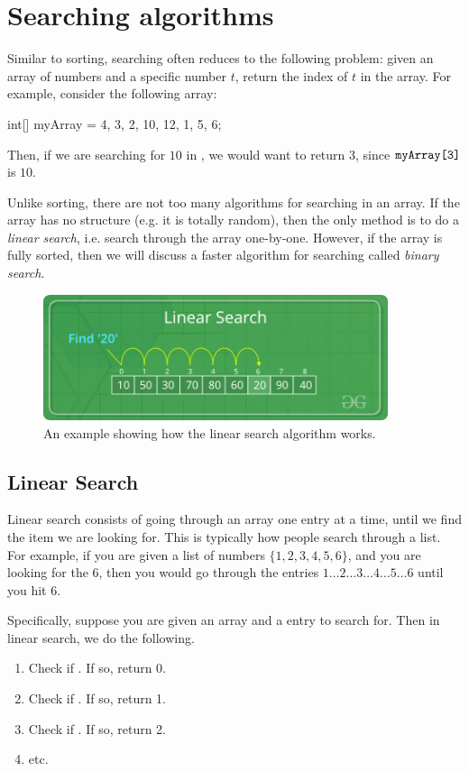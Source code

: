  
\section{Searching algorithms}

Similar to sorting, searching often reduces to the following problem: given an array  of numbers and a specific number $t$, return the index of $t$ in the array. For example, consider the following  array:
\begin{code}
int[] myArray = {4, 3, 2, 10, 12, 1, 5, 6};
\end{code}
Then, if we are searching for $10$ in , we would want to return $3$, since $\texttt{myArray[3]}$ is $10$.

Unlike sorting, there are not too many algorithms for searching in an array. If the array has no structure (e.g. it is totally random), then the only method is to do a \emph{linear search}, i.e. search through the array one-by-one. However, if the array is fully sorted, then we will discuss a faster algorithm for searching called \emph{binary search}.

  \begin{figure}
    \centering
    \includegraphics[width=0.9\textwidth]{lectures/images/Linear-Search.png}
    \caption{An example showing how the linear search algorithm works.}
    \label{fig:linear_search}
\end{figure}

\subsection{Linear Search}

Linear search consists of going through an array one entry at a time, until we find the item we are looking for. This is typically how people search through a list. For example, if you are given a list of numbers $\{1, 2, 3, 4, 5, 6\}$, and you are looking for the $6$, then you would go through the entries $1\dots 2\dots 3 \dots 4 \dots 5 \dots 6$ until you hit $6$.

Specifically, suppose you are given an array  and a entry  to search for. Then in linear search, we do the following.
\begin{enumerate}
    \item Check if . If so, return 0.
    \item Check if . If so, return 1.
    \item Check if . If so, return 2.
    \item etc.
\end{enumerate}
 
